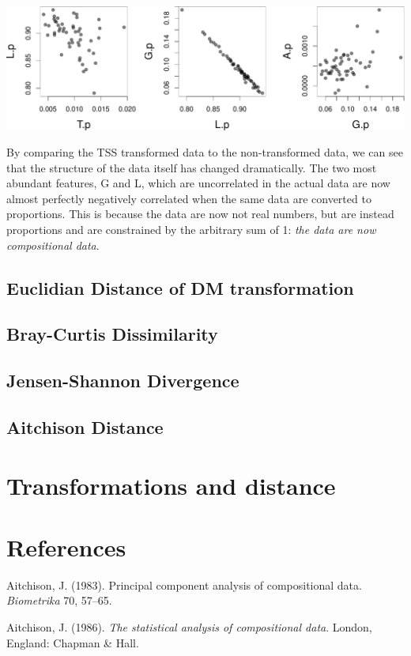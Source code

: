 \documentclass[twocolumn]{article}
\begin{document}
\includegraphics{main_files/figure-latex/R_block_random_prop-1.pdf}

By comparing the TSS transformed data to the non-transformed data, we
can see that the structure of the data itself has changed dramatically.
The two most abundant features, G and L, which are uncorrelated in the
actual data are now almost perfectly negatively correlated when the same
data are converted to proportions. This is because the data are now not
real numbers, but are instead proportions and are constrained by the
arbitrary sum of 1: \emph{the data are now compositional data}.

\subsection{Euclidian Distance of DM transformation}\subsection{Bray-Curtis Dissimilarity}\subsection{Jensen-Shannon Divergence}\subsection{Aitchison Distance}\section{Transformations and distance}

\section*{References}\label{references}

Aitchison, J. (1983). Principal component analysis of compositional
data. \emph{Biometrika} 70, 57--65.

Aitchison, J. (1986). \emph{The statistical analysis of compositional
data}. London, England: Chapman \& Hall.
\end{document}

